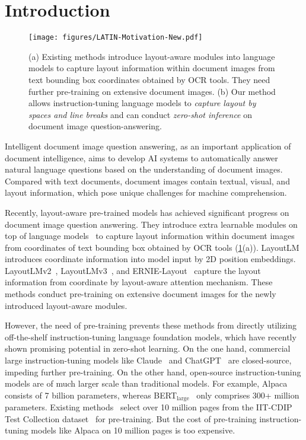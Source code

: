 \documentclass[letterpaper]{article} \usepackage{aaai24_preprint}  \usepackage{times}  \usepackage{helvet}  \usepackage{courier}  \usepackage[hyphens]{url}  \usepackage{graphicx} \urlstyle{rm} \def\UrlFont{\rm}  \usepackage{natbib}  \usepackage{caption} \frenchspacing  \setlength{\pdfpagewidth}{8.5in} \setlength{\pdfpageheight}{11in} \usepackage{algorithm}
\begin{document}
\section{Introduction}
\begin{figure}
\centering
\small
\texttt{[image: figures/LATIN-Motivation-New.pdf]}
\caption{
(a) Existing methods introduce layout-aware modules into language models to capture layout information within document images from text bounding box coordinates obtained by OCR tools.
They need further pre-training on extensive document images.
(b) Our method allows instruction-tuning language models to \emph{capture layout by spaces and line breaks} and can conduct \emph{zero-shot inference} on document image question-answering.
}
\label{fig:motivation}
\end{figure}
Intelligent document image question answering, as an important application of document intelligence, aims to develop AI systems to automatically answer natural language questions based on the understanding of document images.
Compared with text documents, document images contain textual, visual, and layout information, which pose unique challenges for machine comprehension.

Recently, layout-aware pre-trained models has achieved significant progress on document image question answering.
They introduce extra learnable modules on top of language models~\cite{devlinBERTPretrainingDeep2019,liuRoBERTa2019,raffelT52020,baoUniLMv22020} to capture layout information within document images from coordinates of text bounding box obtained by OCR tools (\cref{fig:motivation}(a)).
LayoutLM~\cite{xuLayoutLM2020} introduces coordinate information into model input by 2D position embeddings. LayoutLMv2~\cite{xuLayoutLMv22021}, LayoutLMv3~\cite{huangLayoutLMv32022}, and ERNIE-Layout~\cite{pengERNIELayout2022} capture the layout information from coordinate by layout-aware attention mechanism.
These methods conduct pre-training on extensive document images for the newly introduced layout-aware modules.

However, the need of pre-training prevents these methods from directly utilizing off-the-shelf instruction-tuning language foundation models, which have recently shown promising potential in zero-shot learning.
On the one hand, commercial large instruction-tuning models like Claude~\cite{Claude} and ChatGPT~\cite{ChatGPT} are closed-source, impeding further pre-training.
On the other hand, open-source instruction-tuning models are of much larger scale than traditional models.
For example, Alpaca~\cite{StanfordAlpacaInstructionfollowing2023} consists of 7 billion parameters, whereas BERT$_\text{large}$~\cite{devlinBERTPretrainingDeep2019} only comprises 300+ million parameters.
Existing methods~\cite{xuLayoutLM2020,xuLayoutLMv22021,huangLayoutLMv32022,pengERNIELayout2022} select over 10 million pages from the IIT-CDIP Test Collection dataset~\cite{lewisIIT-CDIP2006} for pre-training. But the cost of pre-training instruction-tuning models like Alpaca on 10 million pages is too expensive.
\end{document}
